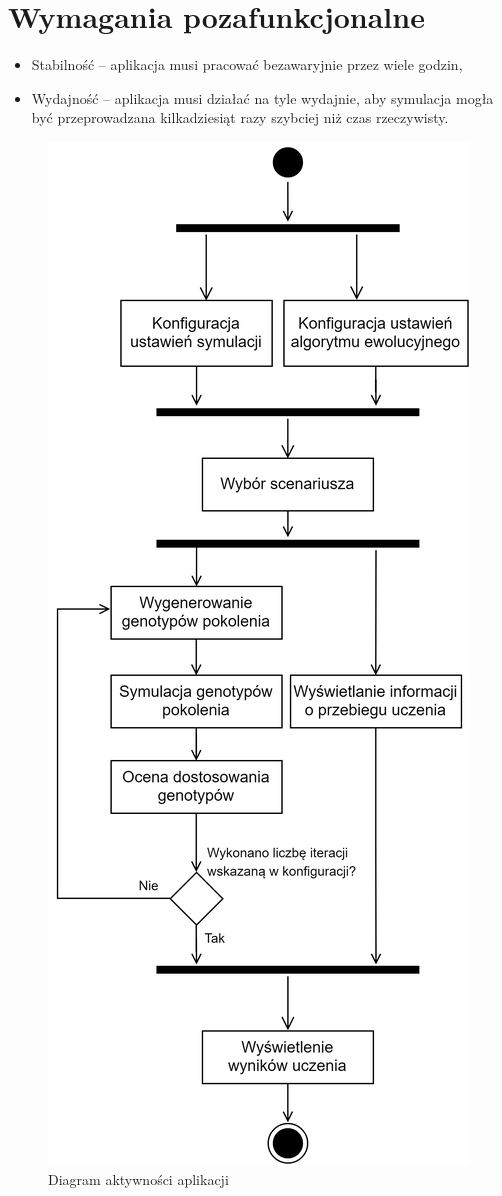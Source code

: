 \section*{Wymagania pozafunkcjonalne}
\begin{itemize}
	\item Stabilność -- aplikacja musi pracować bezawaryjnie przez wiele godzin,
	\item Wydajność -- aplikacja musi działać na tyle wydajnie, aby symulacja mogła być przeprowadzana kilkadziesiąt razy szybciej niż czas rzeczywisty.
\end{itemize}
\begin{figure}
	\centering
	\includegraphics[height=0.9\textheight]{diagram_aktywnosci}
	\caption[Diagram aktywności aplikacji]{Diagram aktywności aplikacji}
	\label{fig:diagramaktywnosci}
\end{figure}

